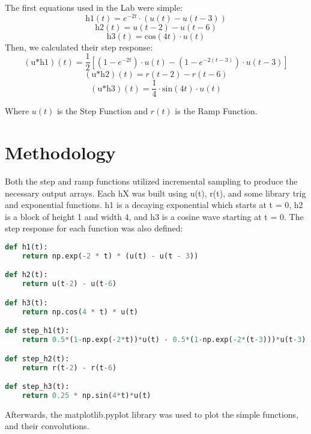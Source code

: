 \documentclass[12pt]{report}
\begin{document}
The first equations used in the Lab were simple:
\begin{equation}
    \text{h1}(t) =e^{-2t} \cdot (u(t) - u(t - 3))
\end{equation}
\begin{equation}
    \text{h2}(t) = u(t - 2) - u(t - 6)
\end{equation}
\begin{equation}
    \text{h3}(t) = \text{cos}(4t) \cdot u(t)
\end{equation}
Then, we calculated their step response:
\begin{equation}
    (\text{u*h1})(t) = \frac{1}{2} [(1 - e^{-2t}) \cdot u(t) - (1 - e^{-2(t - 3)}) \cdot u(t - 3)]
\end{equation}
\begin{equation}
    (\text{u*h2})(t) = r(t - 2) - r(t - 6)
\end{equation}
\begin{equation}
    (\text{u*h3})(t) = \frac{1}{4} \cdot \text{sin}(4t) \cdot u(t)
\end{equation}

Where $u(t)$ is the Step Function and $r(t)$ is the Ramp Function.
\pagebreak


\section{Methodology}

Both the step and ramp functions utilized incremental sampling to produce the necessary output arrays. Each hX was built using u(t), r(t), and some library trig and exponential functions. h1 is a decaying exponential which starts at t = 0, h2 is a block of height 1 and width 4, and h3 is a cosine wave starting at t = 0. The step response for each function was also defined:
\begin{lstlisting}[language=Python]
def h1(t):
    return np.exp(-2 * t) * (u(t) - u(t - 3))

def h2(t):
    return u(t-2) - u(t-6)

def h3(t):
    return np.cos(4 * t) * u(t)

def step_h1(t):
    return 0.5*(1-np.exp(-2*t))*u(t) - 0.5*(1-np.exp(-2*(t-3)))*u(t-3)

def step_h2(t):
    return r(t-2) - r(t-6)

def step_h3(t):
    return 0.25 * np.sin(4*t)*u(t)
\end{lstlisting}
Afterwards, the matplotlib.pyplot library was used to plot the simple functions, and their convolutions.
\end{document}
